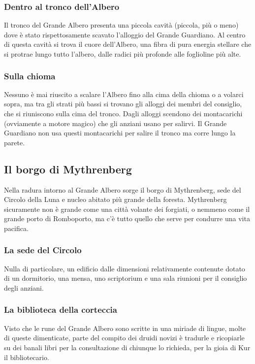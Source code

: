 \subsubsection{Dentro al tronco dell'Albero}

Il tronco del Grande Albero presenta una piccola cavità (piccola, più o meno) dove è stato rispettosamente scavato l'alloggio del Grande Guardiano. Al centro di questa cavità si trova il cuore dell'Albero, una fibra di pura energia stellare che si protrae lungo tutto l'albero, dalle radici più profonde alle foglioline più alte.

\subsubsection{Sulla chioma}

Nessuno è mai riuscito a scalare l'Albero fino alla cima della chioma o a volarci sopra, ma tra gli strati più bassi si trovano gli alloggi dei membri del consiglio, che si riuniscono sulla cima del tronco. Dagli alloggi scendono dei montacarichi (ovviamente a motore magico) che gli anziani usano per salirvi. Il Grande Guardiano non usa questi montacarichi per salire il tronco ma corre lungo la parete.

\subsection{Il borgo di Mythrenberg}

Nella radura intorno al Grande Albero sorge il borgo di Mythrenberg, sede del Circolo della Luna e nucleo abitato più grande della foresta. Mythrenberg sicuramente non è grande come una città volante dei forgiati, o nemmeno come il grande porto di Romboporto, ma c'è tutto quello che serve per condurre una vita pacifica.

\subsubsection{La sede del Circolo} Nulla di particolare, un edificio dalle dimensioni relativamente contenute dotato di un dormitorio, una mensa, uno scriptorium e una sala riunioni per il consiglio degli anziani.

\subsubsection{La biblioteca della corteccia} Visto che le rune del Grande Albero sono scritte in una miriade di lingue, molte di queste dimenticate, parte del compito dei druidi novizi è tradurle e ricopiarle su dei banali libri per la consultazione di chiunque lo richieda, per la gioia di Kur il bibliotecario.


